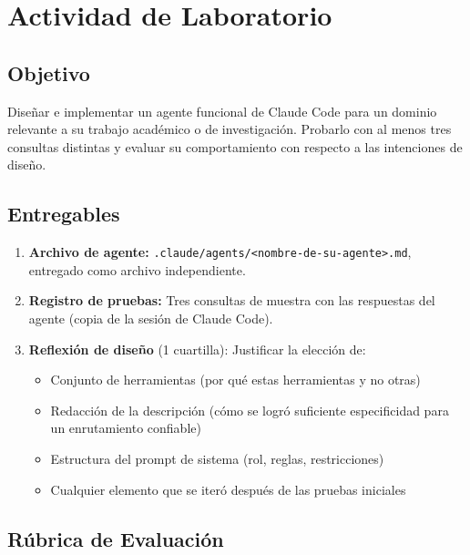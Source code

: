\documentclass[11pt,letterpaper]{article}
\begin{document}
\section{Actividad de Laboratorio}

\subsection{Objetivo}

Diseñar e implementar un agente funcional de Claude Code para un dominio relevante a su trabajo académico o de investigación. Probarlo con al menos tres consultas distintas y evaluar su comportamiento con respecto a las intenciones de diseño.

\subsection{Entregables}

\begin{enumerate}[leftmargin=*]
    \item \textbf{Archivo de agente:} \texttt{.claude/agents/<nombre-de-su-agente>.md}, entregado como archivo independiente.
    \item \textbf{Registro de pruebas:} Tres consultas de muestra con las respuestas del agente (copia de la sesión de Claude Code).
    \item \textbf{Reflexión de diseño} (1 cuartilla): Justificar la elección de:
        \begin{itemize}
            \item Conjunto de herramientas (por qué estas herramientas y no otras)
            \item Redacción de la descripción (cómo se logró suficiente especificidad para un enrutamiento confiable)
            \item Estructura del prompt de sistema (rol, reglas, restricciones)
            \item Cualquier elemento que se iteró después de las pruebas iniciales
        \end{itemize}
\end{enumerate}

\subsection{Rúbrica de Evaluación}
\end{document}
